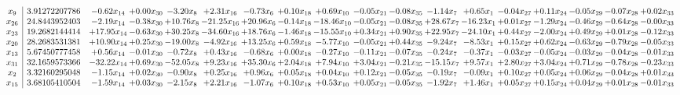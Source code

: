 \documentclass[9pt]{article}
\begin{document}
 \[\begin{array}{c| c c@{\hskip 2pt} c@{\hskip 2pt} c@{\hskip 2pt} c@{\hskip 2pt} c@{\hskip 2pt} c@{\hskip 2pt} c@{\hskip 2pt} c@{\hskip 2pt} c@{\hskip 2pt} c@{\hskip 2pt} c@{\hskip 2pt} c@{\hskip 2pt} c@{\hskip 2pt} c@{\hskip 2pt} c@{\hskip 2pt} c@{\hskip 2pt} }
 x_{9}   &  3.91272207786 & -0.62 x_{14} & +  0.00 x_{30} & -3.20 x_{8} & +  2.31 x_{16} & -0.73 x_{6} & +  0.10 x_{18} & +  0.69 x_{10} & -0.05 x_{21} & -0.08 x_{35} & -1.14 x_{7} & +  0.65 x_{1} & -0.04 x_{27} & +  0.11 x_{24} & -0.05 x_{29} & -0.07 x_{28} & +  0.02 x_{33}\\
 x_{26}   &  24.8443952403 & -2.19 x_{14} & -0.38 x_{30} & + 10.76 x_{8} & -21.25 x_{16} & + 20.96 x_{6} & -0.14 x_{18} & -18.46 x_{10} & -0.05 x_{21} & -0.08 x_{35} & + 28.67 x_{7} & -16.23 x_{1} & +  0.01 x_{27} & -1.29 x_{24} & -0.46 x_{29} & -0.64 x_{28} & -0.00 x_{33}\\
 x_{23}   &  19.2682144414 & + 17.95 x_{14} & -0.63 x_{30} & + 30.25 x_{8} & -34.60 x_{16} & + 18.76 x_{6} & -1.46 x_{18} & -15.55 x_{10} & +  0.34 x_{21} & +  0.90 x_{35} & + 22.95 x_{7} & -24.10 x_{1} & +  0.44 x_{27} & -2.00 x_{24} & +  0.49 x_{29} & +  0.01 x_{28} & -0.12 x_{33}\\
 x_{20}   &  28.2683531381 & + 10.90 x_{14} & +  0.25 x_{30} & -19.00 x_{8} & -4.92 x_{16} & + 13.25 x_{6} & +  0.59 x_{18} & -5.77 x_{10} & -0.05 x_{21} & +  0.44 x_{35} & -9.24 x_{7} & -8.53 x_{1} & +  0.15 x_{27} & +  0.62 x_{24} & -0.63 x_{29} & -0.79 x_{28} & -0.05 x_{33}\\
 x_{13}   &  5.67450777458 & +  0.56 x_{14} & -0.01 x_{30} & -0.72 x_{8} & +  0.43 x_{16} & -0.68 x_{6} & +  0.00 x_{18} & -0.27 x_{10} & -0.11 x_{21} & -0.07 x_{35} & -0.24 x_{7} & -0.37 x_{1} & -0.03 x_{27} & -0.05 x_{24} & -0.03 x_{29} & -0.04 x_{28} & -0.01 x_{33}\\
 x_{31}   &  32.1659573366 & -32.22 x_{14} & +  0.69 x_{30} & -52.05 x_{8} & +  9.23 x_{16} & + 35.30 x_{6} & +  2.04 x_{18} & +  7.94 x_{10} & +  3.04 x_{21} & -0.21 x_{35} & -15.15 x_{7} & +  9.57 x_{1} & +  2.80 x_{27} & +  3.04 x_{24} & +  0.71 x_{29} & -0.78 x_{28} & -0.23 x_{33}\\
 x_{2}   &  3.32160295048 & -1.15 x_{14} & +  0.02 x_{30} & -0.90 x_{8} & +  0.25 x_{16} & +  0.96 x_{6} & +  0.05 x_{18} & +  0.04 x_{10} & +  0.12 x_{21} & -0.05 x_{35} & -0.19 x_{7} & -0.09 x_{1} & +  0.10 x_{27} & +  0.05 x_{24} & +  0.06 x_{29} & -0.04 x_{28} & +  0.01 x_{33}\\
 x_{15}   &  3.68105410504 & -1.59 x_{14} & +  0.03 x_{30} & -2.15 x_{8} & +  2.21 x_{16} & -1.07 x_{6} & +  0.10 x_{18} & +  0.53 x_{10} & +  0.05 x_{21} & -0.05 x_{35} & -1.92 x_{7} & +  1.46 x_{1} & +  0.05 x_{27} & +  0.15 x_{24} & +  0.04 x_{29} & +  0.01 x_{28} & -0.01 x_{33}\\

\end{array}\]
\end{document}

